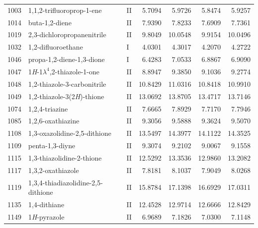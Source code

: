 \begin{longtable}{rlld{2.5}d{2.5}d{2.5}d{2.5}}
    1003 & 1,1,2-trifluoroprop-1-ene                              & II & 5.7094  & 5.9726  & 5.8474  & 5.9257  \\
    1014 & buta-1,2-diene                                         & II & 7.9390  & 7.8233  & 7.6909  & 7.7361  \\
    1019 & 2,3-dichloropropanenitrile                             & II & 9.8049  & 10.0548 & 9.9154  & 10.0496 \\
    1032 & 1,2-difluoroethane                                     & I  & 4.0301  & 4.3017  & 4.2070  & 4.2722  \\
    1046 & propa-1,2-diene-1,3-dione                              & I  & 6.4283  & 7.0533  & 6.8867  & 6.9090  \\
    1047 & 1\textit{H}-1$\lambda^4$,2-thiazole-1-one              & II & 8.8947  & 9.3850  & 9.1036  & 9.2774  \\
    1048 & 1,2-thiazole-3-carbonitrile                            & II & 10.8429 & 11.0316 & 10.8418 & 10.9910 \\
    1049 & 1,2-thiazole-3(2\textit{H})-thione                     & II & 13.0692 & 13.8705 & 13.4717 & 13.7146 \\
    1074 & 1,2,4-triazine                                         & II & 7.6665  & 7.8929  & 7.7170  & 7.7946  \\
    1085 & 1,2,6-oxathiazine                                      & II & 9.3056  & 9.5888  & 9.3624  & 9.5070  \\
    1108 & 1,3-oxazolidine-2,5-dithione                           & II & 13.5497 & 14.3977 & 14.1122 & 14.3525 \\
    1109 & penta-1,3-diyne                                        & II & 9.3074  & 9.2102  & 9.0067  & 9.1558  \\
    1115 & 1,3-thiazolidine-2-thione                              & II & 12.5292 & 13.3536 & 12.9860 & 13.2082 \\
    1117 & 1,3,2-oxathiazole                                      & II & 7.8181  & 8.1037  & 7.9049  & 8.0268  \\
    1119 & 1,3,4-thiadiazolidine-2,5-dithione                     & II & 15.8784 & 17.1398 & 16.6929 & 17.0311 \\
    1135 & 1,4-dithiane                                           & II & 12.4528 & 12.9714 & 12.6666 & 12.8429 \\
    1149 & 1\textit{H}-pyrazole                                   & II & 6.9689  & 7.1826  & 7.0300  & 7.1148  \\

\end{longtable}
